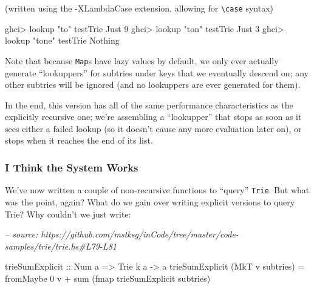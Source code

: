 \documentclass[]{article}
\newenvironment{Shaded}{}{}
\newcommand{\CommentTok}[1]{\textcolor[rgb]{0.38,0.63,0.69}{\textit{#1}}}
\newcommand{\DataTypeTok}[1]{\textcolor[rgb]{0.56,0.13,0.00}{#1}}
\newcommand{\DecValTok}[1]{\textcolor[rgb]{0.25,0.63,0.44}{#1}}
\newcommand{\FunctionTok}[1]{\textcolor[rgb]{0.02,0.16,0.49}{#1}}
\newcommand{\NormalTok}[1]{#1}
\newcommand{\OtherTok}[1]{\textcolor[rgb]{0.00,0.44,0.13}{#1}}
\newcommand{\StringTok}[1]{\textcolor[rgb]{0.25,0.44,0.63}{#1}}
\begin{document}
(written using the -XLambdaCase extension, allowing for
\texttt{\textbackslash{}case} syntax)

\begin{Shaded}
\begin{Highlighting}[]
\NormalTok{ghci}\FunctionTok{>} \FunctionTok{lookup} \StringTok{"to"}\NormalTok{ testTrie}
\DataTypeTok{Just} \DecValTok{9}
\NormalTok{ghci}\FunctionTok{>} \FunctionTok{lookup} \StringTok{"ton"}\NormalTok{ testTrie}
\DataTypeTok{Just} \DecValTok{3}
\NormalTok{ghci}\FunctionTok{>} \FunctionTok{lookup} \StringTok{"tone"}\NormalTok{ testTrie}
\DataTypeTok{Nothing}
\end{Highlighting}
\end{Shaded}

Note that because \texttt{Map}s have lazy values by default, we only ever
actually generate ``lookuppers'' for subtries under keys that we eventually
descend on; any other subtries will be ignored (and no lookuppers are ever
generated for them).

In the end, this version has all of the same performance characteristics as the
explicitly recursive one; we're assembling a ``lookupper'' that stops as soon as
it sees either a failed lookup (so it doesn't cause any more evaluation later
on), or stops when it reaches the end of its list.

\hypertarget{i-think-the-system-works}{%
\subsubsection{I Think the System Works}\label{i-think-the-system-works}}

We've now written a couple of non-recursive functions to ``query''
\texttt{Trie}. But what was the point, again? What do we gain over writing
explicit versions to query Trie? Why couldn't we just write:

\begin{Shaded}
\begin{Highlighting}[]
\CommentTok{-- source: https://github.com/mstksg/inCode/tree/master/code-samples/trie/trie.hs#L79-L81}

\OtherTok{trieSumExplicit ::} \DataTypeTok{Num}\NormalTok{ a }\OtherTok{=>} \DataTypeTok{Trie}\NormalTok{ k a }\OtherTok{->}\NormalTok{ a}
\NormalTok{trieSumExplicit (}\DataTypeTok{MkT}\NormalTok{ v subtries) }\FunctionTok{=}
\NormalTok{    fromMaybe }\DecValTok{0}\NormalTok{ v }\FunctionTok{+} \FunctionTok{sum}\NormalTok{ (}\FunctionTok{fmap}\NormalTok{ trieSumExplicit subtries)}
\end{Highlighting}
\end{Shaded}
\end{document}
